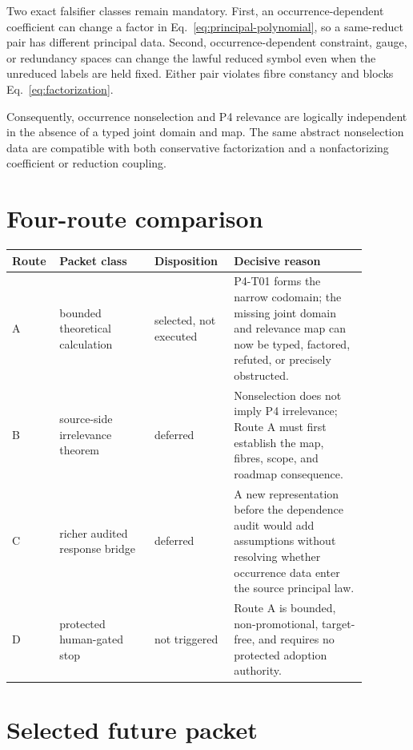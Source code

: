 \documentclass[11pt]{article}
\begin{document}
Two exact falsifier classes remain mandatory. First, an occurrence-dependent
coefficient can change a factor in Eq.~\eqref{eq:principal-polynomial}, so a
same-reduct pair has different principal data. Second, occurrence-dependent
constraint, gauge, or redundancy spaces can change the lawful reduced symbol
even when the unreduced labels are held fixed. Either pair violates fibre
constancy and blocks Eq.~\eqref{eq:factorization}.

Consequently, occurrence nonselection and P4 relevance are logically
independent in the absence of a typed joint domain and map. The same abstract
nonselection data are compatible with both conservative factorization and a
nonfactorizing coefficient or reduction coupling.

\section{Four-route comparison}

\begin{center}
\small
\begin{tabular}{>{\raggedright\arraybackslash}p{0.08\linewidth}
                >{\raggedright\arraybackslash}p{0.25\linewidth}
                >{\raggedright\arraybackslash}p{0.20\linewidth}
                >{\raggedright\arraybackslash}p{0.35\linewidth}}
\toprule
Route & Packet class & Disposition & Decisive reason\\
\midrule
A & bounded theoretical calculation & selected, not executed & P4-T01 forms
the narrow codomain; the missing joint domain and relevance map can now be
typed, factored, refuted, or precisely obstructed.\\
B & source-side irrelevance theorem & deferred & Nonselection does not imply
P4 irrelevance; Route A must first establish the map, fibres, scope, and
roadmap consequence.\\
C & richer audited response bridge & deferred & A new representation before
the dependence audit would add assumptions without resolving whether
occurrence data enter the source principal law.\\
D & protected human-gated stop & not triggered & Route A is bounded,
non-promotional, target-free, and requires no protected adoption authority.\\
\bottomrule
\end{tabular}
\end{center}

\section{Selected future packet}
\end{document}
